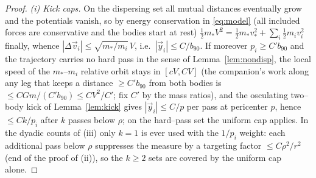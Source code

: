 \documentclass[11pt]{article}
\begin{document}
\begin{proof}
\emph{(i) Kick caps.} On the dispersing set all mutual distances eventually grow and the potentials
vanish, so by energy conservation in \eqref{eq:model} (all included forces are conservative and the
bodies start at rest) $\tfrac12 m_*V^2=\tfrac12 m_*v_*^2+\sum_i\tfrac12 m_iv_i^2$ finally, whence
$|\Delta\vec v_i|\le\sqrt{m_*/m_i}\,V$, i.e.\ $|\vec y_i|\le C/b_{90}$. If moreover $p_i\ge C'b_{90}$
and the trajectory carries no hard pass in the sense of Lemma~\ref{lem:nondisp}, the local speed of
the $m_*$--$m_i$ relative orbit stays in $[cV,CV]$ (the companion's work along any leg that keeps a
distance $\ge C'b_{90}$ from both bodies is $\le CGm/(C'b_{90})\le CV^2/C'$; fix $C'$ by the mass
ratios), and the osculating two--body kick of Lemma~\ref{lem:kick} gives $|\vec y_i|\le C/p$ per
pass at pericenter $p$, hence $\le Ck/p_i$ after $k$ passes below $\rho$; on
the hard--pass set the uniform cap applies. In the dyadic counts of (iii) only $k=1$ is ever used
with the $1/p_i$ weight: each additional pass below $\rho$ suppresses the measure by a targeting
factor $\le C\rho^2/r^2$ (end of the proof of (ii)), so the $k\ge2$ sets are covered by the
uniform cap alone.


\end{proof}
\end{document}
